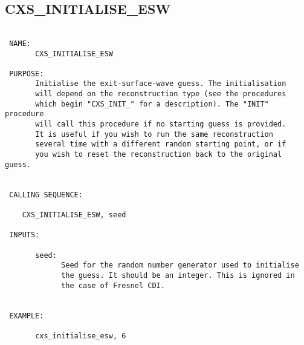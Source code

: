 \subsection{CXS\_INITIALISE\_ESW}
\begin{verbatim}

 NAME:
       CXS_INITIALISE_ESW

 PURPOSE:
       Initialise the exit-surface-wave guess. The initialisation
       will depend on the reconstruction type (see the procedures
       which begin "CXS_INIT_" for a description). The "INIT" procedure  
       will call this procedure if no starting guess is provided. 
       It is useful if you wish to run the same reconstruction
       several time with a different random starting point, or if 
       you wish to reset the reconstruction back to the original guess.


 CALLING SEQUENCE:

	CXS_INITIALISE_ESW, seed

 INPUTS:

       seed: 
             Seed for the random number generator used to initialise
             the guess. It should be an integer. This is ignored in 
             the case of Fresnel CDI.


 EXAMPLE:

       cxs_initialise_esw, 6

\end{verbatim}



